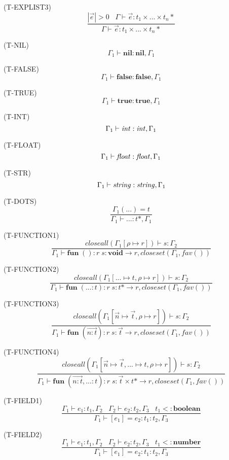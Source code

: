 \documentclass{paper}
\newcommand{\Nil}{\mathbf{nil}}
\newcommand{\False}{\mathbf{false}}
\newcommand{\True}{\mathbf{true}}
\newcommand{\Boolean}{\mathbf{boolean}}
\newcommand{\Number}{\mathbf{number}}
\newcommand{\Void}{\mathbf{void}}
\newcommand{\mylabel}[1]{\; (\textsc{#1})}
\newcommand{\env}{\Gamma}
\newcommand{\subtype}{<:}
\newcommand{\ret}{\rho}
\begin{document}
\mylabel{T-EXPLIST3}
\[
\dfrac{|\vec{e}| > 0 \;\;\;
       \env \vdash \vec{e}:t_{1} \times ... \times t_{n}{*}}
      {\env \vdash \vec{e}:t_{1} \times ... \times t_{n}{*}}
\]

\mylabel{T-NIL}
\[
\env_{1} \vdash \mathbf{nil}:\Nil, \env_{1}
\]

\mylabel{T-FALSE}
\[
\env_{1} \vdash \mathbf{false}:\False, \env_{1}
\]

\mylabel{T-TRUE}
\[
\env_{1} \vdash \mathbf{true}:\True, \env_{1}
\]

\mylabel{T-INT}
\[
\env_{1} \vdash {\it int}:{\it int}, \env_{1}
\]

\mylabel{T-FLOAT}
\[
\env_{1} \vdash {\it float}:{\it float}, \env_{1}
\]

\mylabel{T-STR}
\[
\env_{1} \vdash {\it string}:{\it string}, \env_{1}
\]

\mylabel{T-DOTS}
\[
\dfrac{\env_{1}({...}) = t}
      {\env_{1} \vdash {...}:t{*}, \env_{1}}
\]

\mylabel{T-FUNCTION1}
\[
\dfrac{closeall(\env_{1}[\ret \mapsto r]) \vdash s:\env_{2}}
      {\env_{1} \vdash \mathbf{fun} \; (){:}r \; s:\Void \rightarrow r, closeset(\env_{1}, fav())}
\]

\mylabel{T-FUNCTION2}
\[
\dfrac{closeall(\env_{1}[{...} \mapsto t, \ret \mapsto r]) \vdash s:\env_{2}}
      {\env_{1} \vdash \mathbf{fun} \; ({...}{:}t){:}r \; s:t{*} \rightarrow r, closeset(\env_{1}, fav())}
\]

\mylabel{T-FUNCTION3}
\[
\dfrac{closeall(\env_{1}[\vec{n} \mapsto \vec{t}, \ret \mapsto r]) \vdash s:\env_{2}}
      {\env_{1} \vdash \mathbf{fun} \; (\vec{n{:}t}){:}r \; s:\vec{t} \rightarrow r, closeset(\env_{1}, fav())}
\]

\mylabel{T-FUNCTION4}
\[
\dfrac{closeall(\env_{1}[\vec{n} \mapsto \vec{t}, {...} \mapsto t, \ret \mapsto r]) \vdash s:\env_{2}}
      {\env_{1} \vdash \mathbf{fun} \; (\vec{n{:}t},{...}{:}t){:}r \; s: \vec{t} \times t{*} \rightarrow r, closeset(\env_{1}, fav())}
\]

\mylabel{T-FIELD1}
\[
\dfrac{\env_{1} \vdash e_{1}:t_{1}, \env_{2} \;\;\;
       \env_{2} \vdash e_{2}:t_{2}, \env_{3} \;\;\;
       t_{1} \subtype \Boolean}
      {\env_{1} \vdash [e_{1}] = e_{2}:t_{1}:t_{2}, \env_{3}}
\]

\mylabel{T-FIELD2}
\[
\dfrac{\env_{1} \vdash e_{1}:t_{1}, \env_{2} \;\;\;
       \env_{2} \vdash e_{2}:t_{2}, \env_{3} \;\;\;
       t_{1} \subtype \Number}
      {\env_{1} \vdash [e_{1}] = e_{2}:t_{1}:t_{2}, \env_{3}}
\]
\end{document}
